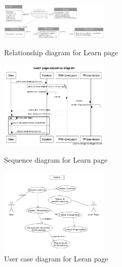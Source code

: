 \begin{figure}
	\centering
	\begin{minipage}[b]{0.3\textwidth}
		\includegraphics[width=5.2cm]{diagrams/Rlearnpage.png}
		\caption{Relationship diagram for Learn page}	
	\end{minipage}
	\begin{minipage}[b]{0.3\textwidth}
		\includegraphics[width=5.2cm]{diagrams/Slearnpage.png}
		\caption{Sequence diagram for Learn page}
	\end{minipage}
	\begin{minipage}[b]{0.3\textwidth}
		\includegraphics[width=5.2cm]{diagrams/UClearnpage.png}
		\caption{User case diagram for Leran page}
	\end{minipage}
\end{figure}

